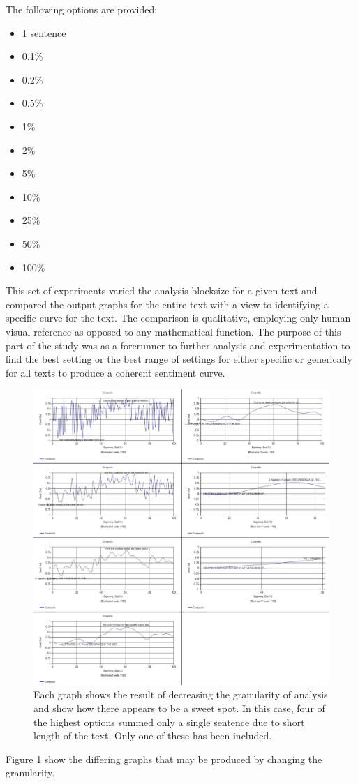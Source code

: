 \documentclass[a4paper]{article}
\begin{document}
        The following options are provided:
        \begin{itemize}
            \item 1 sentence
            \item 0.1\%
            \item 0.2\%
            \item 0.5\%
            \item 1\%
            \item 2\%
            \item 5\%
            \item 10\%
            \item 25\%
            \item 50\%
            \item 100\%
        \end{itemize}
        This set of experiments varied the analysis blocksize for a given text and compared the output graphs for the entire text with a view to identifying a specific curve for the text. The comparison is qualitative, employing only human visual reference as opposed to any mathematical function. The purpose of this part of the study was as a forerunner to further analysis and experimentation to find the best setting or the best range of settings for either specific or generically for all texts to produce a coherent sentiment curve.
        \begin{figure}
            \includegraphics[width=1\textwidth]{Figures/Blocksize/Cinderella/cinderellaGran}
            \centering
            \caption{Each graph shows the result of decreasing the granularity of analysis and show how there appears to be a sweet spot. In this case, four of the highest options summed only a single sentence due to short length of the text. Only one of these has been included.}
            \label{fig:cinderellaGran}
        \end{figure}
        Figure \ref{fig:cinderellaGran} show the differing graphs that may be produced by changing the granularity.
\end{document}

